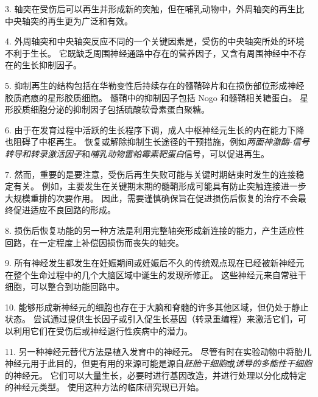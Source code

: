 3. 轴突在受伤后可以再生并形成新的突触，但在哺乳动物中，外周轴突的再生比中央轴突的再生更为广泛和有效。


4. 外周轴突和中央轴突反应不同的一个关键因素是，受伤的中央轴突所处的环境不利于生长。
它既缺乏周围神经通路中存在的营养因子，又含有周围神经中不存在的生长抑制因子。


5. 抑制再生的结构包括在华勒变性后持续存在的髓鞘碎片和在损伤部位形成神经胶质疤痕的星形胶质细胞。
髓鞘中的抑制因子包括 Nogo 和髓鞘相关糖蛋白。
星形胶质细胞分泌的抑制因子包括硫酸软骨素蛋白聚糖。
 

6. 由于在发育过程中活跃的生长程序下调，成人中枢神经元生长的内在能力下降也阻碍了中枢再生。
恢复或解除抑制生长途径的干预措施，例如\textit{两面神激酶-信号转导和转录激活因子}和\textit{哺乳动物雷帕霉素靶蛋白}信号，可以促进再生。


7. 然而，重要的是要注意，受伤后再生失败可能与关键时期结束时发生的连接稳定有关。
例如，主要发生在关键期末期的髓鞘形成可能具有防止突触连接进一步大规模重排的次要作用。
因此，需要谨慎确保旨在促进损伤后恢复的治疗不会最终促进适应不良回路的形成。 


8. 损伤后恢复功能的另一种方法是利用完整轴突形成新连接的能力，产生适应性回路，在一定程度上补偿因损伤而丧失的轴突。 


9. 所有神经发生都发生在妊娠期间或妊娠后不久的传统观点现在已经被新神经元在整个生命过程中的几个大脑区域中诞生的发现所修正。
这些神经元来自常驻干细胞，可以整合到功能回路中。


10. 能够形成新神经元的细胞也存在于大脑和脊髓的许多其他区域，但仍处于静止状态。
尝试通过提供生长因子或引入促生长基因（转录重编程）来激活它们，可以利用它们在受伤后或神经退行性疾病中的潜力。


11. 另一种神经元替代方法是植入发育中的神经元。
尽管有时在实验动物中将胎儿神经元用于此目的，但更有用的来源可能是源自\textit{胚胎干细胞}或\textit{诱导的多能性干细胞}的神经元。
它们可以大量生长，必要时进行基因改造，并进行处理以分化成特定的神经元类型。
使用这种方法的临床研究现已开始。



